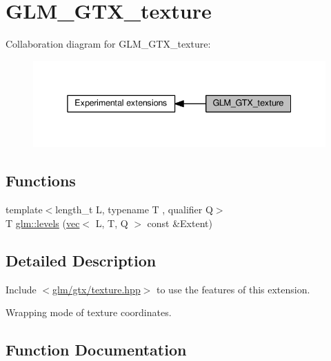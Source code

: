 \hypertarget{group__gtx__texture}{}\section{G\+L\+M\+\_\+\+G\+T\+X\+\_\+texture}
\label{group__gtx__texture}
Collaboration diagram for G\+L\+M\+\_\+\+G\+T\+X\+\_\+texture\+:
\nopagebreak
\begin{figure}[H]
\begin{center}
\leavevmode
\includegraphics[width=338pt]{d5/db0/group__gtx__texture}
\end{center}
\end{figure}
\subsection*{Functions}
\begin{DoxyCompactItemize}
\item 
{\footnotesize template$<$length\+\_\+t L, typename T , qualifier Q$>$ }\\T \hyperlink{group__gtx__texture_gaa8c377f4e63486db4fa872d77880da73}{glm\+::levels} (\hyperlink{structglm_1_1vec}{vec}$<$ L, T, Q $>$ const \&Extent)
\end{DoxyCompactItemize}


\subsection{Detailed Description}
Include $<$\hyperlink{texture_8hpp}{glm/gtx/texture.\+hpp}$>$ to use the features of this extension.

Wrapping mode of texture coordinates. 

\subsection{Function Documentation}
\mbox{\label{group__gtx__texture_gaa8c377f4e63486db4fa872d77880da73}} 
